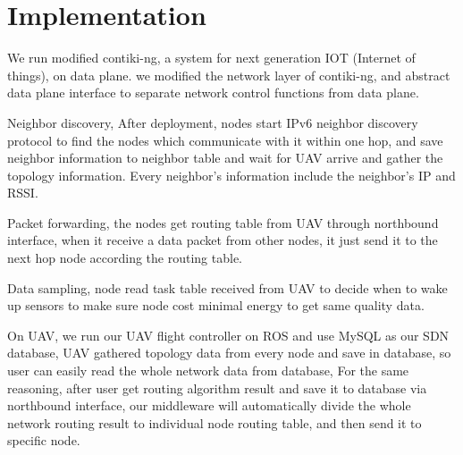 \section{Implementation}
\label{Imp}

We run modified contiki-ng, a system for next generation IOT (Internet of things), on data plane. we modified the network layer of contiki-ng, and abstract data plane interface to separate network control functions from data plane. 

Neighbor discovery, After deployment, nodes start IPv6 neighbor discovery protocol to find the nodes which communicate with it within one hop, and save neighbor information to neighbor table and wait for UAV arrive 
and gather the topology information. Every neighbor's information include the neighbor's IP and RSSI. 

Packet forwarding, the nodes get routing table from UAV through northbound interface, when it receive a data packet from other nodes, it just send it to the next hop node according the routing table.

Data sampling, node read task table received from UAV to decide when to wake up sensors to make sure node cost minimal energy to get same quality data. 

On UAV, we run our UAV flight controller on ROS and use MySQL as our SDN database, UAV gathered topology data from every node and save in database, 
so user can easily read the whole network data from database, For the same 
reasoning, after user get routing algorithm result and save it to database via northbound interface, 
our middleware will automatically divide the whole network routing result to individual node routing table, and then send it to specific node.

